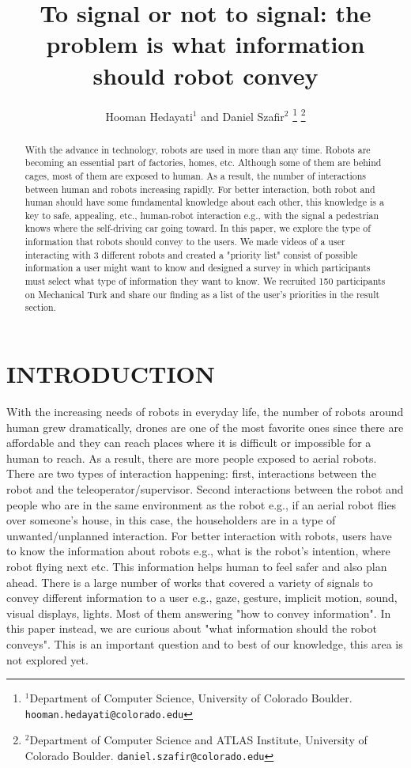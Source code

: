 \documentclass[letterpaper, 10 pt, conference]{ieeeconf}  %
\title{\LARGE \bf
To signal or not to signal: the problem is what information should robot convey
}
\author{Hooman Hedayati$^{1}$ and Daniel Szafir$^{2}$%
\thanks{$^{1}$Department of Computer Science, University of Colorado Boulder.
        {\tt\small hooman.hedayati@colorado.edu}}%
	\thanks{$^{2}$Department of Computer Science and ATLAS Institute, University of Colorado Boulder.
		{\tt\small daniel.szafir@colorado.edu}}%
}
\begin{document}
\maketitle
\thispagestyle{empty}
\pagestyle{empty}


\begin{abstract}
With the advance in technology, robots are used in more than any time. Robots are becoming an essential part of factories, homes, etc. Although some of them are behind cages, most of them are exposed to human. As a result, the number of interactions between human and robots increasing rapidly. For better interaction, both robot and human should have some fundamental knowledge about each other, this knowledge is a key to safe, appealing, etc., human-robot interaction e.g., with the signal a pedestrian knows where the self-driving car going toward. In this paper, we explore the type of information that robots should convey to the users.  We made videos of a user interacting with 3 different robots and created a "priority list" consist of possible information a user might want to know and designed a survey in which participants must select what type of information they want to know. We recruited 150 participants on Mechanical Turk and share our finding as a list of the user's priorities in the result section.

\end{abstract}


\section{INTRODUCTION}

With the increasing needs of robots in everyday life, the number of robots around human grew dramatically, drones are one of the most favorite ones since there are affordable and they can reach places where it is difficult or impossible for a human to reach. As a result, there are more people exposed to aerial robots. There are two types of interaction happening: first, interactions between the robot and the teleoperator/supervisor. Second interactions between the robot and people who are in the same environment as the robot e.g., if an aerial robot flies over someone's house, in this case, the householders are in a type of unwanted/unplanned interaction. For better interaction with robots, users have to know the information about robots e.g., what is the robot's intention, where robot flying next etc. This information helps human to feel safer and also plan ahead. There is a large number of works that covered a variety of signals to convey different information to a user \cite{cha2018survey} e.g., gaze, gesture, implicit motion, sound, visual displays, lights. Most of them answering "how to convey information". In this paper instead, we are curious about "what information should the robot conveys". This is an important question and to best of our knowledge, this area is not explored yet. 
\end{document}
